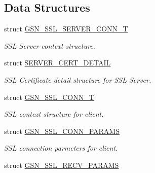 \subsection*{Data Structures}
\begin{DoxyCompactItemize}
\item 
struct \hyperlink{a00245}{GSN\_\-SSL\_\-SERVER\_\-CONN\_\-T}
\begin{DoxyCompactList}\small\item\em SSL Server context structure. \end{DoxyCompactList}\item 
struct \hyperlink{a00459}{SERVER\_\-CERT\_\-DETAIL}
\begin{DoxyCompactList}\small\item\em SSL Certificate detail structure for SSL Server. \end{DoxyCompactList}\item 
struct \hyperlink{a00243}{GSN\_\-SSL\_\-CONN\_\-T}
\begin{DoxyCompactList}\small\item\em SSL context structure for client. \end{DoxyCompactList}\item 
struct \hyperlink{a00242}{GSN\_\-SSL\_\-CONN\_\-PARAMS}
\begin{DoxyCompactList}\small\item\em SSL connection parmeters for client. \end{DoxyCompactList}\item 
struct \hyperlink{a00244}{GSN\_\-SSL\_\-RECV\_\-PARAMS}
\end{DoxyCompactItemize}
